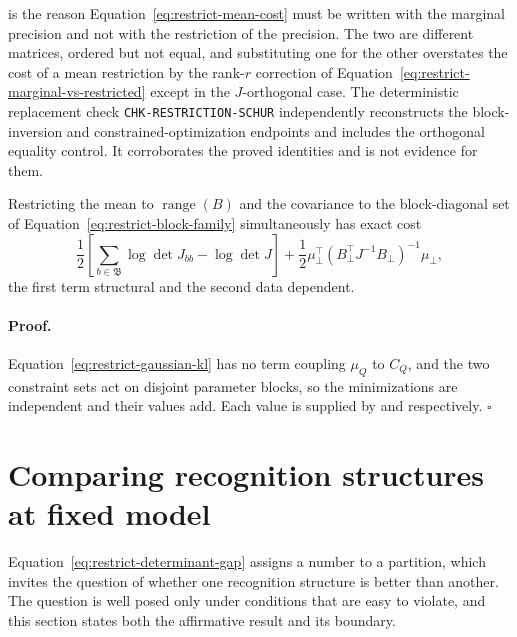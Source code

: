 is the reason Equation~\eqref{eq:restrict-mean-cost} must be written with the marginal precision and not with the restriction of the precision. The two are different matrices, ordered but not equal, and substituting one for the other overstates the cost of a mean restriction by the rank-$r$ correction of Equation~\eqref{eq:restrict-marginal-vs-restricted} except in the $J$-orthogonal case. The deterministic replacement check \texttt{CHK-RESTRICTION-SCHUR} independently reconstructs the block-inversion and constrained-optimization endpoints and includes the orthogonal equality control. It corroborates the proved identities and is not evidence for them. 

Restricting the mean to $\operatorname{range}(B)$ and the covariance to the block-diagonal set of Equation~\eqref{eq:restrict-block-family} simultaneously has exact cost
\begin{equation}
\frac12\left[\sum_{b\in\mathfrak B}\log\det J_{bb}-\log\det J\right]
+\frac12\mu_\perp^\top\left(B_\perp^\top J^{-1}B_\perp\right)^{-1}\mu_\perp,
\label{eq:restrict-combined-cost}
\end{equation}
the first term structural and the second data dependent. 

\paragraph{Proof.}
Equation~\eqref{eq:restrict-gaussian-kl} has no term coupling $\mu_Q$ to $C_Q$, and the two constraint sets act on disjoint parameter blocks, so the minimizations are independent and their values add. Each value is supplied by  and  respectively. $\square$

\section{Comparing recognition structures at fixed model}
\label{sec:restrict-comparison}

Equation~\eqref{eq:restrict-determinant-gap} assigns a number to a partition, which invites the question of whether one recognition structure is better than another. The question is well posed only under conditions that are easy to violate, and this section states both the affirmative result and its boundary.

